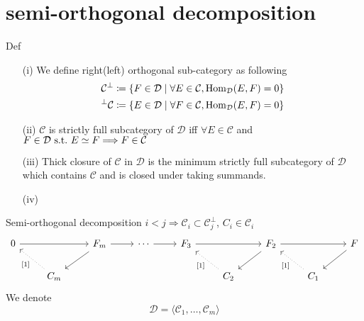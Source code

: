 \documentclass[leqno]{ltjsarticle}
\begin{document}
\section{semi-orthogonal decomposition}
\begin{itembox}[l]{Def}
	\begin{itemize}
		\item[(i)]
				We define right(left) orthogonal sub-category as following
		\begin{gather*}
			\mathcal C^{\perp}\coloneq \{F\in\mathcal D\mid \forall E\in\mathcal C, \operatorname{\mathrm{Hom}}_{\mathcal D}(E,F)=0\}\\
			 {}^{\perp}\mathcal C\coloneq \{E\in\mathcal D\mid \forall F\in\mathcal C, \operatorname{\mathrm{Hom}}_{\mathcal D}(E,F)=0\}
		\end{gather*}
	\item[(ii)]
		$\mathcal C$ is strictly full subcategory of $\mathcal D$ iff $\forall E\in\mathcal C$ and $F\in\mathcal D\ \mathrm{s.t.}\  E\simeq F\Longrightarrow F\in\mathcal C$ 
	\item[(iii)]
		Thick closure of $\mathcal C$ in $\mathcal D$ is the minimum strictly full subcategory of $\mathcal D$ which contains $\mathcal C$ and is closed under taking summands.
	\item[(iv)]
		
	\end{itemize}

\end{itembox}
\begin{itembox}[l]{Semi-orthogonal decomposition}
		$i<j\Longrightarrow \mathcal C_i \subset \mathcal C_j^\perp$, $C_i \in \mathcal C_i$
	\[
		\begin{tikzcd}
			0\ar[rr]& & F_{m}\ar[r]\ar[ld] &\cdots\ar[r] &F_{3}\ar[rr]&&F_{2}\ar[ld]\ar[rr]&&F\ar[ld]\\
								 &C_{m}\ar[lu,dotted,"{[1]}"] &&&&C_2\ar[lu,dotted,"{[1]}"]&&C_1\ar[lu,dotted,"{[1]}"]
		\end{tikzcd}
	\]
	We denote 
	\[\mathcal D = \langle \mathcal C_1,\ldots ,\mathcal C_m\rangle\]
\end{itembox}
\end{document}
